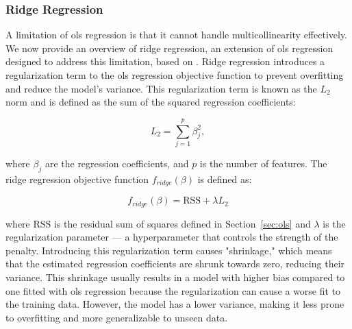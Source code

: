 \subsubsection{Ridge Regression}
A limitation of \gls{ols} regression is that it cannot handle multicollinearity effectively.
We now provide an overview of ridge regression, an extension of \gls{ols} regression designed to address this limitation, based on \citet{James2023AnIS}.
Ridge regression introduces a regularization term to the \gls{ols} regression objective function to prevent overfitting and reduce the model's variance.
This regularization term is known as the $L_2$ norm and is defined as the sum of the squared regression coefficients:

$$
L_2 = \sum_{j=1}^{p} \beta_j^2,
$$

where $\beta_j$ are the regression coefficients, and $p$ is the number of features.
The ridge regression objective function $f_{ridge}(\beta)$ is defined as:

$$
f_{ridge}(\beta) = \text{RSS} + \lambda L_2
$$

where $\text{RSS}$ is the residual sum of squares defined in Section~\ref{sec:ols} and $\lambda$ is the regularization parameter --- a hyperparameter that controls the strength of the penalty.
Introducing this regularization term causes "shrinkage," which means that the estimated regression coefficients are shrunk towards zero, reducing their variance.
This shrinkage usually results in a model with higher bias compared to one fitted with \gls{ols} regression because the regularization can cause a worse fit to the training data.
However, the model has a lower variance, making it less prone to overfitting and more generalizable to unseen data.